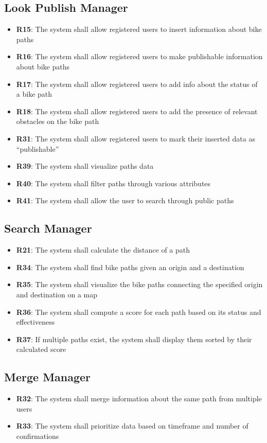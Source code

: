 \subsection*{Look Publish Manager}
\begin{itemize}
	\item \textbf{R15}: The system shall allow registered users to insert information about bike paths
	\item \textbf{R16}: The system shall allow registered users to make publishable information about bike paths
	\item \textbf{R17}: The system shall allow registered users to add info about the status of a bike path
	\item \textbf{R18}: The system shall allow registered users to add the presence of relevant obstacles on the bike path
	\item \textbf{R31}: The system shall allow registered users to mark their inserted data as ``publishable''
	\item \textbf{R39}: The system shall visualize paths data
	\item \textbf{R40}: The system shall filter paths through various attributes
	\item \textbf{R41}: The system shall allow the user to search through public paths
\end{itemize}

\subsection*{Search Manager}
\begin{itemize}
	\item \textbf{R21}: The system shall calculate the distance of a path
	\item \textbf{R34}: The system shall find bike paths given an origin and a destination
	\item \textbf{R35}: The system shall visualize the bike paths connecting the specified origin and destination on a map
	\item \textbf{R36}: The system shall compute a score for each path based on its status and effectiveness
	\item \textbf{R37}: If multiple paths exist, the system shall display them sorted by their calculated score
\end{itemize}

\subsection*{Merge Manager}
\begin{itemize}
	\item \textbf{R32}: The system shall merge information about the same path from multiple users
	\item \textbf{R33}: The system shall prioritize data based on timeframe and number of confirmations
\end{itemize}

